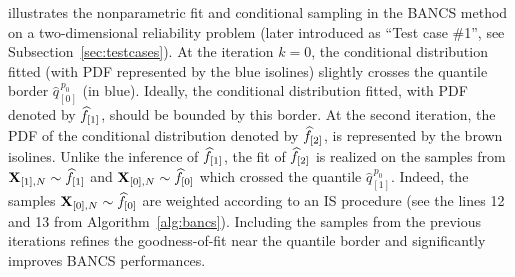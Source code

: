  illustrates the nonparametric fit and conditional sampling in the BANCS method on a two-dimensional reliability problem (later introduced as ``Test case \#1'', see Subsection~\ref{sec:testcases}). 
At the iteration $k=0$, the conditional distribution fitted (with PDF represented by the blue isolines) slightly crosses the quantile border $\widehat{q}_{[0]}^{\, p_0}$ (in blue). 
Ideally, the conditional distribution fitted, with PDF denoted by $\widehat{f}_{[1]}$, should be bounded by this border. 
At the second iteration, the PDF of the conditional distribution denoted by $\widehat{f}_{[2]}$, is represented by the brown isolines. 
Unlike the inference of $\widehat{f}_{[1]}$, the fit of $\widehat{f}_{[2]}$ is realized on the samples from ${\bf X}_{[1], N} \sim \widehat{f}_{[1]}$ and ${\bf X}_{[0], N} \sim \widehat{f}_{[0]}$ which crossed the quantile $\widehat{q}_{[1]}^{\, p_0}$. 
Indeed, the samples ${\bf X}_{[0], N} \sim \widehat{f}_{[0]}$ are weighted according to an IS procedure (see the lines 12 and 13 from Algorithm~\ref{alg:bancs}). 
Including the samples from the previous iterations refines the goodness-of-fit near the quantile border and significantly improves BANCS performances. 

